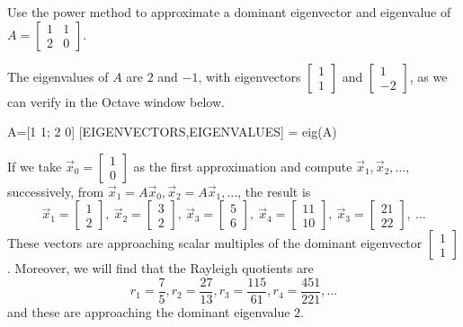 \documentclass{ximera}
\begin{document}
\begin{exploration}\label{exp:2x2PowerMethod}
Use the power method to approximate a dominant eigenvector and eigenvalue of $A = \left[ \begin{array}{rr}
1 & 1 \\
2 & 0
\end{array}\right]$.

The eigenvalues of $A$ are $2$ and $-1$, with eigenvectors $\left[ \begin{array}{rr}
  1 \\
  1
  \end{array}\right]$ and $\left[ \begin{array}{rr}
  1 \\
  -2
  \end{array}\right]$, as we can verify in the Octave window below. 

A=[1 1; 2 0]
[EIGENVECTORS,EIGENVALUES] = eig(A)
  
If we take $\vec{x}_{0} = \left[ \begin{array}{rr}
  1 \\
  0
  \end{array}\right]$ as the first approximation and compute $\vec{x}_{1}, \vec{x}_{2}, \dots,$ successively, from $\vec{x}_{1} = A\vec{x}_{0}, \vec{x}_{2} = A\vec{x}_{1}, \dots$, the result is
\begin{equation*}
\vec{x}_{1} = \left[ \begin{array}{rr}
1 \\
2
\end{array}\right], \
\vec{x}_{2} = \left[ \begin{array}{rr}
3 \\
2
\end{array}\right], \
\vec{x}_{3} = \left[ \begin{array}{rr}
5 \\
6
\end{array}\right], \
\vec{x}_{4} = \left[ \begin{array}{rr}
11 \\
10
\end{array}\right], \
\vec{x}_{3} = \left[ \begin{array}{rr}
21 \\
22
\end{array}\right], \ \dots
\end{equation*}
These vectors are approaching scalar multiples of the dominant eigenvector $\left[ \begin{array}{rr}
1 \\
1
\end{array}\right]$. Moreover, we will find that the Rayleigh quotients are
\begin{equation*}
r_{1} = \frac{7}{5}, r_{2} = \frac{27}{13}, r_{3} = \frac{115}{61}, r_{4} = \frac{451}{221}, \dots
\end{equation*}
and these are approaching the dominant eigenvalue $2$.


\end{exploration}
\end{document}
